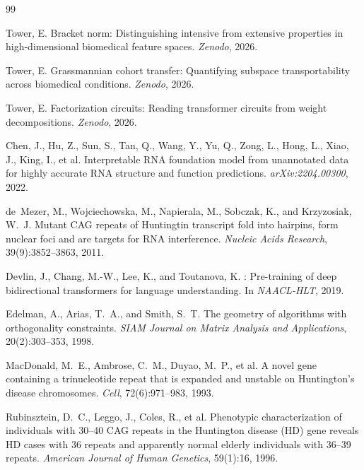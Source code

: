 \documentclass[11pt]{article}
\begin{document}
\begin{thebibliography}{99}

Tower, E.
\newblock Bracket norm: Distinguishing intensive from extensive properties in high-dimensional biomedical feature spaces.
\newblock \emph{Zenodo}, 2026.

Tower, E.
\newblock Grassmannian cohort transfer: Quantifying subspace transportability across biomedical conditions.
\newblock \emph{Zenodo}, 2026.

Tower, E.
\newblock Factorization circuits: Reading transformer circuits from weight decompositions.
\newblock \emph{Zenodo}, 2026.

Chen, J., Hu, Z., Sun, S., Tan, Q., Wang, Y., Yu, Q., Zong, L., Hong, L., Xiao, J., King, I., et al.
\newblock Interpretable RNA foundation model from unannotated data for highly accurate RNA structure and function predictions.
\newblock \emph{arXiv:2204.00300}, 2022.

de~Mezer, M., Wojciechowska, M., Napierala, M., Sobczak, K., and Krzyzosiak, W.~J.
\newblock Mutant {CAG} repeats of {Huntingtin} transcript fold into hairpins, form nuclear foci and are targets for {RNA} interference.
\newblock \emph{Nucleic Acids Research}, 39(9):3852--3863, 2011.

Devlin, J., Chang, M.-W., Lee, K., and Toutanova, K.
: Pre-training of deep bidirectional transformers for language understanding.
\newblock In \emph{NAACL-HLT}, 2019.

Edelman, A., Arias, T.~A., and Smith, S.~T.
\newblock The geometry of algorithms with orthogonality constraints.
\newblock \emph{SIAM Journal on Matrix Analysis and Applications}, 20(2):303--353, 1998.

MacDonald, M.~E., Ambrose, C.~M., Duyao, M.~P., et al.
\newblock A novel gene containing a trinucleotide repeat that is expanded and unstable on {Huntington's} disease chromosomes.
\newblock \emph{Cell}, 72(6):971--983, 1993.

Rubinsztein, D.~C., Leggo, J., Coles, R., et al.
\newblock Phenotypic characterization of individuals with 30--40 {CAG} repeats in the {Huntington} disease ({HD}) gene reveals {HD} cases with 36 repeats and apparently normal elderly individuals with 36--39 repeats.
\newblock \emph{American Journal of Human Genetics}, 59(1):16, 1996.


\end{thebibliography}
\end{document}
